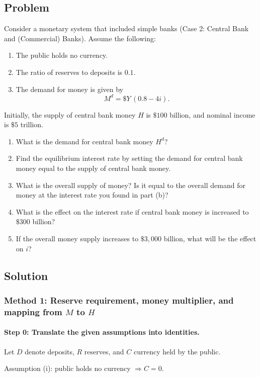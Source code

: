 \documentclass[12pt]{article}
\begin{document}
\subsection*{Problem}
Consider a monetary system that included simple banks (Case 2: Central Bank and (Commercial) Banks). Assume the following:
\begin{enumerate}[label=\roman*.]
  \item The public holds no currency.
  \item The ratio of reserves to deposits is \(0.1\).
  \item The demand for money is given by
  \[
  M^d = \$Y\,(0.8-4i).
  \]
\end{enumerate}
Initially, the supply of central bank money \(H\) is \(\$100\) billion, and nominal income is \(\$5\) trillion.
\begin{enumerate}[label=(\alph*)]
  \item What is the demand for central bank money \(H^d\)?
  \item Find the equilibrium interest rate by setting the demand for central bank money equal to the supply of central bank money.
  \item What is the overall supply of money? Is it equal to the overall demand for money at the interest rate you found in part (b)?
  \item What is the effect on the interest rate if central bank money is increased to \(\$300\) billion?
  \item If the overall money supply increases to \(\$3{,}000\) billion, what will be the effect on \(i\)?
\end{enumerate}

\subsection*{Solution}

\subsubsection*{Method 1: Reserve requirement, money multiplier, and mapping from \(M\) to \(H\)}
\paragraph{Step 0: Translate the given assumptions into identities.}
Let \(D\) denote deposits, \(R\) reserves, and \(C\) currency held by the public.

Assumption (i): public holds no currency \(\Rightarrow C=0\).
\end{document}
